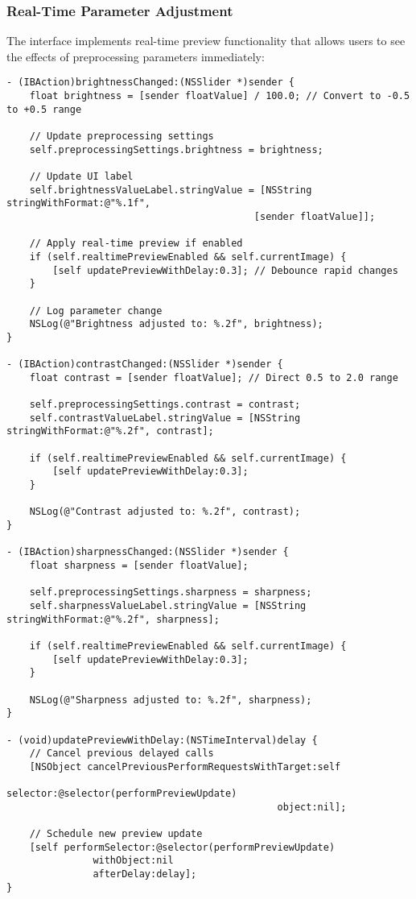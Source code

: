 \subsubsection{Real-Time Parameter Adjustment}

The interface implements real-time preview functionality that allows users to see the effects of preprocessing parameters immediately:

\begin{verbatim}
- (IBAction)brightnessChanged:(NSSlider *)sender {
    float brightness = [sender floatValue] / 100.0; // Convert to -0.5 to +0.5 range
    
    // Update preprocessing settings
    self.preprocessingSettings.brightness = brightness;
    
    // Update UI label
    self.brightnessValueLabel.stringValue = [NSString stringWithFormat:@"%.1f", 
                                           [sender floatValue]];
    
    // Apply real-time preview if enabled
    if (self.realtimePreviewEnabled && self.currentImage) {
        [self updatePreviewWithDelay:0.3]; // Debounce rapid changes
    }
    
    // Log parameter change
    NSLog(@"Brightness adjusted to: %.2f", brightness);
}

- (IBAction)contrastChanged:(NSSlider *)sender {
    float contrast = [sender floatValue]; // Direct 0.5 to 2.0 range
    
    self.preprocessingSettings.contrast = contrast;
    self.contrastValueLabel.stringValue = [NSString stringWithFormat:@"%.2f", contrast];
    
    if (self.realtimePreviewEnabled && self.currentImage) {
        [self updatePreviewWithDelay:0.3];
    }
    
    NSLog(@"Contrast adjusted to: %.2f", contrast);
}

- (IBAction)sharpnessChanged:(NSSlider *)sender {
    float sharpness = [sender floatValue];
    
    self.preprocessingSettings.sharpness = sharpness;
    self.sharpnessValueLabel.stringValue = [NSString stringWithFormat:@"%.2f", sharpness];
    
    if (self.realtimePreviewEnabled && self.currentImage) {
        [self updatePreviewWithDelay:0.3];
    }
    
    NSLog(@"Sharpness adjusted to: %.2f", sharpness);
}

- (void)updatePreviewWithDelay:(NSTimeInterval)delay {
    // Cancel previous delayed calls
    [NSObject cancelPreviousPerformRequestsWithTarget:self 
                                             selector:@selector(performPreviewUpdate) 
                                               object:nil];
    
    // Schedule new preview update
    [self performSelector:@selector(performPreviewUpdate) 
               withObject:nil 
               afterDelay:delay];
}
\end{verbatim}

